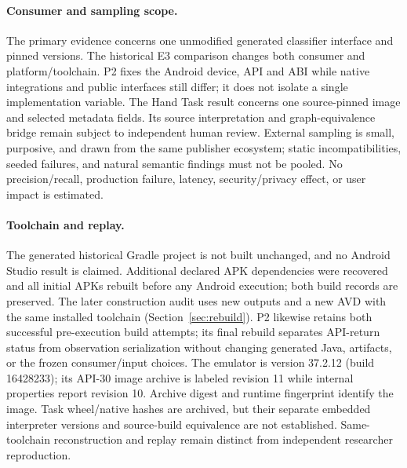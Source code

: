 \documentclass[10pt,twocolumn,letterpaper]{article}
\begin{document}
\paragraph{Consumer and sampling scope.}
The primary evidence concerns one unmodified generated classifier interface and pinned versions. The historical E3 comparison changes both consumer and platform/toolchain. P2 fixes the Android device, API and ABI while native integrations and public interfaces still differ; it does not isolate a single implementation variable. The Hand Task result concerns one source-pinned image and selected metadata fields. Its source interpretation and graph-equivalence bridge remain subject to independent human review. External sampling is small, purposive, and drawn from the same publisher ecosystem; static incompatibilities, seeded failures, and natural semantic findings must not be pooled. No precision/recall, production failure, latency, security/privacy effect, or user impact is estimated.

\paragraph{Toolchain and replay.}
The generated historical Gradle project is not built unchanged, and no Android Studio result is claimed. Additional declared APK dependencies were recovered and all initial APKs rebuilt before any Android execution; both build records are preserved. The later construction audit uses new outputs and a new AVD with the same installed toolchain (Section~\ref{sec:rebuild}). P2 likewise retains both successful pre-execution build attempts; its final rebuild separates API-return status from observation serialization without changing generated Java, artifacts, or the frozen consumer/input choices. The emulator is version 37.2.12 (build 16428233); its API-30 image archive is labeled revision 11 while internal properties report revision 10. Archive digest and runtime fingerprint identify the image. Task wheel/native hashes are archived, but their separate embedded interpreter versions and source-build equivalence are not established. Same-toolchain reconstruction and replay remain distinct from independent researcher reproduction.
\end{document}
